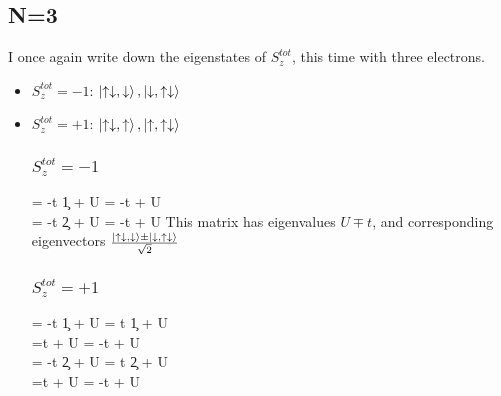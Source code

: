 \documentclass[12pt]{article}
\begin{document}
\subsection{N=3}
I once again write down the eigenstates of \(S_z^{tot}\), this time with three electrons.
\begin{itemize}
\item \(S_z^{tot} = -1\): \(\ket{\uparrow\downarrow,\downarrow}, \ket{\downarrow,\uparrow\downarrow}\)
\item \(S_z^{tot} = +1\): \(\ket{\uparrow\downarrow,\uparrow}, \ket{\uparrow,\uparrow\downarrow}\)
\subsubsection{\(S_z^{tot} = -1\)}
\beq
\ham \ket{\uparrow\downarrow,\downarrow} = -t \c{1}{\uparrow}\ket{\uparrow\downarrow,\downarrow} + U\ket{\uparrow\downarrow,\downarrow} = -t\ket{\downarrow,\uparrow\downarrow} + U\ket{\uparrow\downarrow,\downarrow} \\
\ham \ket{\downarrow,\uparrow\downarrow} = -t \c{2}{\uparrow}\ket{\downarrow,\uparrow\downarrow} + U\ket{\downarrow,\uparrow\downarrow} = -t\ket{\uparrow\downarrow,\downarrow} + U\ket{\downarrow,\uparrow\downarrow}
\eeq
\beq
{}
\eeq
This matrix has eigenvalues \(U \mp t\), and corresponding eigenvectors \(\frac{\ket{\uparrow\downarrow,\downarrow} \pm \ket{\downarrow,\uparrow\downarrow}}{\sqrt{2}}\)

\subsubsection{\(S_z^{tot} = +1\)}
\beq
\ham \ket{\uparrow\downarrow,\uparrow} = -t \c{1}{\downarrow}\ket{\uparrow\downarrow,\uparrow} + U\ket{\uparrow\downarrow,\uparrow} = t \c{1}{\downarrow}\ket{\downarrow\uparrow,\uparrow} + U\ket{\uparrow\downarrow,\uparrow} \\
=t \ket{\uparrow,\downarrow\uparrow} + U\ket{\uparrow\downarrow,\uparrow} = -t \ket{\uparrow,\uparrow\downarrow} + U\ket{\uparrow\downarrow,\uparrow}\\
\ham \ket{\uparrow,\uparrow\downarrow} = -t \c{2}{\downarrow}\ket{\uparrow,\uparrow\downarrow} + U\ket{\uparrow,\uparrow\downarrow} = t \c{2}{\downarrow}\ket{\uparrow,\downarrow\uparrow} + U\ket{\uparrow,\uparrow\downarrow} \\
=t \ket{\downarrow\uparrow,\uparrow} + U\ket{\uparrow,\uparrow\downarrow} = -t \ket{\uparrow\downarrow,\uparrow} + U\ket{\uparrow,\uparrow\downarrow}\\
\eeq
\beq
{}
\eeq
\end{itemize}
\end{document}
